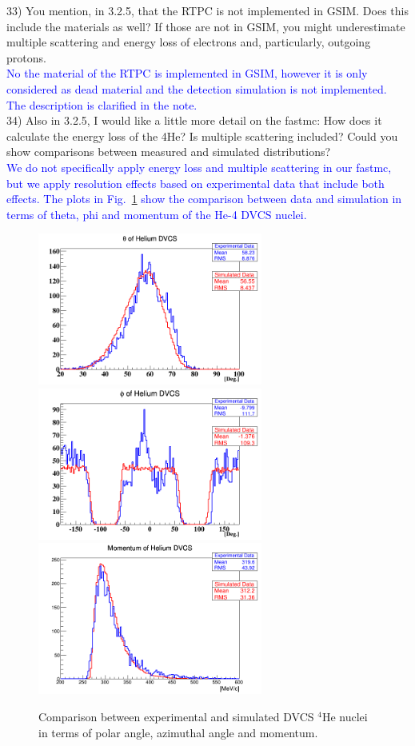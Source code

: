  
33) You mention, in 3.2.5, that the RTPC is not implemented in GSIM. Does this 
include the materials as well? If those are not in GSIM, you might 
underestimate multiple scattering and energy loss of electrons and, 
particularly, outgoing protons.\\
\textcolor{blue}{No the material of the RTPC is implemented in GSIM,
however it is only considered as dead material and the detection 
simulation is not implemented. The description is clarified in the
note.} \\


34) Also in 3.2.5, I would like a little more detail on the fastmc: How does it 
calculate the energy loss of the 4He? Is multiple scattering included? Could 
you show comparisons between measured and simulated distributions?\\
\textcolor{blue}{We do not specifically apply energy loss and multiple 
scattering in our fastmc, but we apply resolution effects based on 
experimental data that include both effects. The plots in Fig.~\ref{fig:comp_He} 
show the comparison between data and simulation in terms of theta, phi and 
momentum of the He-4 DVCS nuclei.}\\

\begin{figure}[!h]
\includegraphics[height=5.0cm]{fig/He_theta.png}
\includegraphics[height=5.0cm]{fig/He_phi.png}
\centering
\includegraphics[height=5.0cm]{fig/He_mom.png}
\caption{Comparison between experimental and simulated DVCS $^{4}$He nuclei in 
terms of polar angle, azimuthal angle and momentum.}
\label{fig:comp_He}
\end{figure}

